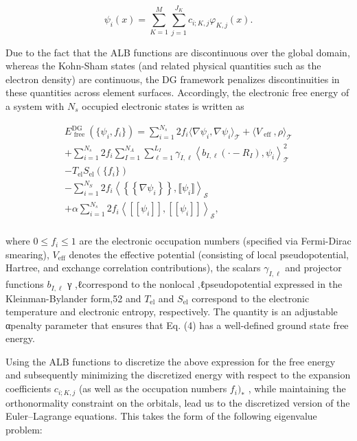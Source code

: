 \documentclass[
  10
]{article}
\begin{document}
\[
\psi_ {i} (x) = \sum_ {K = 1} ^ {M} \sum_ {j = 1} ^ {J _ {K}} c _ {i; K, j} \varphi_ {K, j} (x). \tag {3}
\]

Due to the fact that the ALB functions are discontinuous over the global
domain, whereas the Kohn-Sham states (and related physical quantities
such as the electron density) are continuous, the DG framework penalizes
discontinuities in these quantities across element surfaces.
Accordingly, the electronic free energy of a system with \(N _ { s }\)
occupied electronic states is written as

\[
\begin{array}{l} E _ {\text { free }} ^ {\mathrm{DG}} (\{\psi_ {i}, f _ {i} \}) = \sum_ {i = 1} ^ {N _ {s}} 2 f _ {i} \langle \nabla \psi_ {i}, \nabla \psi_ {i} \rangle_ {\mathcal {T}} + \langle V _ {\text { eff }}, \rho \rangle_ {\mathcal {T}} \\ + \sum_ {i = 1} ^ {N _ {s}} 2 f _ {i} \sum_ {I = 1} ^ {N _ {A}} \sum_ {\ell = 1} ^ {L _ {I}} \gamma_ {I, \ell} \left\langle b _ {I, \ell} (\cdot - R _ {I}), \psi_ {i} \right\rangle_ {\mathcal {T}} ^ {2} \\ - T _ {\mathrm{el}} S _ {\mathrm{el}} (\{f _ {i} \}) \\ - \sum_ {i = 1} ^ {N _ {S}} 2 f _ {i} \left\langle \left\{\left\{\nabla \psi_ {i} \right\} \right\}, \llbracket \psi_ {i} \rrbracket \right\rangle_ {\mathcal {S}} \\ + \alpha \sum_ {i = 1} ^ {N _ {s}} 2 f _ {i} \left\langle [   [ \psi_ {i} ]   ], [   [ \psi_ {i} ]   ] \right\rangle_ {\mathcal {S}}, \tag {4} \\ \end{array}
\]

where \(0 \leq f _ { i } \leq 1\) are the electronic occupation numbers
(specified via Fermi-Dirac smearing), \(V _ { \mathrm { e f f } }\)
denotes the effective potential (consisting of local pseudopotential,
Hartree, and exchange correlation contributions), the scalars
\(\gamma _ { I , \ell }\) and projector functions \(b _ { I , \ell }\) γ
,ℓcorrespond to the nonlocal ,ℓpseudopotential expressed in the
Kleinman-Bylander form,52 and \(T _ { \mathrm { e l } }\) and
\(S _ { \mathrm { e l } }\) correspond to the electronic temperature and
electronic entropy, respectively. The quantity is an adjustable αpenalty
parameter that ensures that Eq. (4) has a well-defined ground state free
energy.

Using the ALB functions to discretize the above expression for the free
energy and subsequently minimizing the discretized energy with respect
to the expansion coefficients \(c _ { i ; K , j }\) (as well as the
occupation numbers \(f _ { i } ) _ { \ast }\) , while maintaining the
orthonormality constraint on the orbitals, lead us to the discretized
version of the Euler--Lagrange equations. This takes the form of the
following eigenvalue problem:
\end{document}
